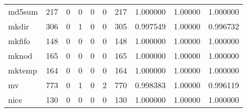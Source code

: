 \begin{longtable}{lrrrrrrrrr}
md5sum    &                    217 &                                  0 &                                 0 &                                0 &                                 0 &                             217 &                                1.000000 &                                1.00000 &                             1.000000 \\
mkdir     &                    306 &                                  0 &                                 1 &                                0 &                                 0 &                             305 &                                0.997549 &                                1.00000 &                             0.996732 \\
mkfifo    &                    148 &                                  0 &                                 0 &                                0 &                                 0 &                             148 &                                1.000000 &                                1.00000 &                             1.000000 \\
mknod     &                    165 &                                  0 &                                 0 &                                0 &                                 0 &                             165 &                                1.000000 &                                1.00000 &                             1.000000 \\
mktemp    &                    164 &                                  0 &                                 0 &                                0 &                                 0 &                             164 &                                1.000000 &                                1.00000 &                             1.000000 \\
mv        &                    773 &                                  0 &                                 1 &                                0 &                                 2 &                             770 &                                0.998383 &                                1.00000 &                             0.996119 \\
nice      &                    130 &                                  0 &                                 0 &                                0 &                                 0 &                             130 &                                1.000000 &                                1.00000 &                             1.000000 \\

\end{longtable}
